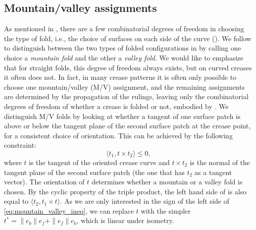 \subsection{Mountain/valley assignments} \label{sec:MV_assignments}
As mentioned in , there are a few combinatorial degrees of freedom in choosing the type of fold, i.e., the choice of surfaces on each side of the curve (). We follow \cite{demaine_lens} to distinguish between the two types of folded configurations in  by calling one choice a \emph{mountain fold} and the other a \emph{valley fold}. We would like to emphasize that for straight folds, this degree of freedom always exists, but on curved creases it often does not. In fact, in many crease patterns it is often only possible to choose one mountain/valley (M/V) assignment, and the remaining assignments are determined by the propagation of the rulings, leaving only the combinatorial degrees of freedom of whether a crease is folded or not, embodied by . 
 We distinguish M/V folds by looking at whether a tangent of one surface patch is above or below the tangent plane of the second surface patch at the crease point, for a consistent choice of orientation. This can be achieved by the following constraint:
\begin{equation} \label{eq:mountain_valley_ineq}
\langle t_1, t \times t_2 \rangle \leq 0,
\end{equation}
where $t$ is the tangent of the oriented crease curve and $t \times t_2$ is the normal of the tangent plane of the second surface patch (the one that has $t_2$ as a tangent vector). The orientation of $t$ determines whether a mountain or a valley fold is chosen. By the cyclic property of the triple product, the left hand side of  is also equal to $\langle t_2, t_1 \times t \rangle$.
As we are only interested in the sign of the left side of \eqref{eq:mountain_valley_ineq}, we can replace $t$ with the simpler $t^* = \|e_b\|e_f + \|e_f\|e_b$, which is linear under isometry.
 
